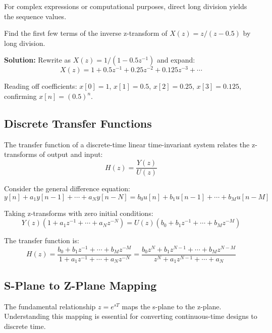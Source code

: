 For complex expressions or computational purposes, direct long division yields the sequence values.

\begin{examplebox}
Find the first few terms of the inverse z-transform of $X(z) = z/(z - 0.5)$ by long division.

\textbf{Solution:} Rewrite as $X(z) = 1/(1 - 0.5z^{-1})$ and expand:
\begin{equation}
X(z) = 1 + 0.5z^{-1} + 0.25z^{-2} + 0.125z^{-3} + \cdots
\end{equation}

Reading off coefficients: $x[0] = 1$, $x[1] = 0.5$, $x[2] = 0.25$, $x[3] = 0.125$, confirming $x[n] = (0.5)^n$.
\end{examplebox}

\subsection{Discrete Transfer Functions}

The transfer function of a discrete-time linear time-invariant system relates the z-transforms of output and input:
\begin{equation}
H(z) = \frac{Y(z)}{U(z)}
\end{equation}

Consider the general difference equation:
\begin{equation}
y[n] + a_1 y[n-1] + \cdots + a_N y[n-N] = b_0 u[n] + b_1 u[n-1] + \cdots + b_M u[n-M]
\end{equation}

Taking z-transforms with zero initial conditions:
\begin{equation}
Y(z)(1 + a_1 z^{-1} + \cdots + a_N z^{-N}) = U(z)(b_0 + b_1 z^{-1} + \cdots + b_M z^{-M})
\end{equation}

The transfer function is:
\begin{equation}
H(z) = \frac{b_0 + b_1 z^{-1} + \cdots + b_M z^{-M}}{1 + a_1 z^{-1} + \cdots + a_N z^{-N}} = \frac{b_0 z^N + b_1 z^{N-1} + \cdots + b_M z^{N-M}}{z^N + a_1 z^{N-1} + \cdots + a_N}
\end{equation}

\subsection{S-Plane to Z-Plane Mapping}

The fundamental relationship $z = e^{sT}$ maps the s-plane to the z-plane. Understanding this mapping is essential for converting continuous-time designs to discrete time.

